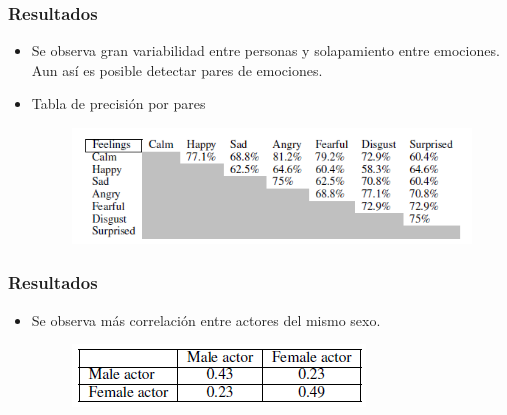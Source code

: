 \documentclass{beamer}
\begin{document}
\begin{frame}
\frametitle{Resultados}
\begin{itemize}
\item<1-> Se observa gran variabilidad entre personas y solapamiento entre emociones. Aun así es posible detectar pares de emociones.
\item<2-> Tabla de precisión por pares
\begin{figure}
\includegraphics[scale=0.7]{precision}
\end{figure}
\end{itemize}
\begin{figure}
\end{figure}
\end{frame}

\begin{frame}
\frametitle{Resultados}
\begin{itemize}
\item<1-> Se observa más correlación entre actores del mismo sexo.
\begin{figure}
\includegraphics[scale=0.8]{sexos}
\end{figure}
\end{itemize}
\end{frame}
\end{document}
